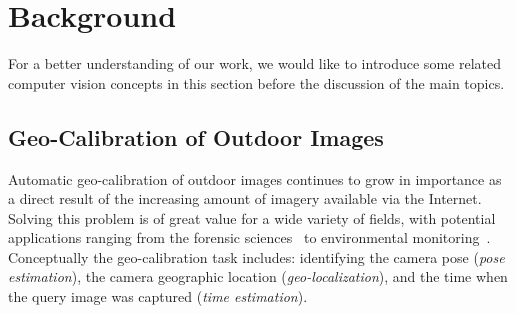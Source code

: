 \section{Background}
For a better understanding of our work, we would like to introduce
some related computer vision concepts in this section before the
discussion of the main topics.

\subsection{Geo-Calibration of Outdoor Images}
Automatic geo-calibration of outdoor images continues to grow in
importance as a direct result of the increasing amount of imagery
available via the Internet. Solving this problem is of great value
for a wide variety of fields, with potential applications ranging from
the forensic sciences~\cite{stylianou13jane} to environmental
monitoring~\cite{zhang2012mining}. Conceptually the geo-calibration
task includes: identifying the camera pose ({\em pose estimation}),
the camera geographic location ({\em geo-localization}), and the time
when the query image was captured ({\em time estimation}).

